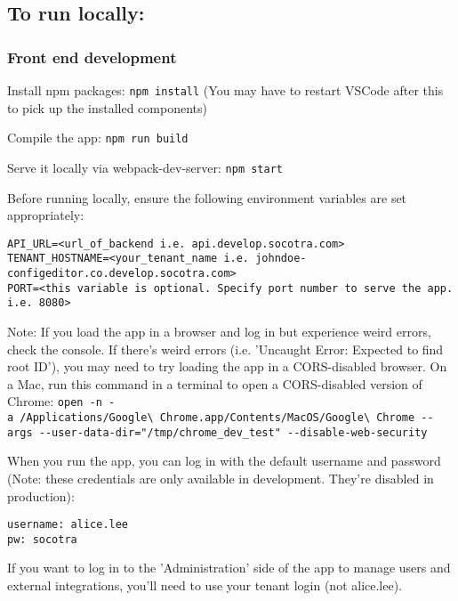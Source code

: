 \hypertarget{to-run-locally}{%
\subsection{To run locally:}\label{to-run-locally}}

\hypertarget{front-end-development}{%
\subsubsection{Front end development}\label{front-end-development}}

Install npm packages: \texttt{npm\ install} (You may have to restart
VSCode after this to pick up the installed components)

Compile the app: \texttt{npm\ run\ build}

Serve it locally via webpack-dev-server: \texttt{npm\ start}

Before running locally, ensure the following environment variables are
set appropriately:

\begin{verbatim}
API_URL=<url_of_backend i.e. api.develop.socotra.com>
TENANT_HOSTNAME=<your_tenant_name i.e. johndoe-configeditor.co.develop.socotra.com>
PORT=<this variable is optional. Specify port number to serve the app. i.e. 8080>
\end{verbatim}

Note: If you load the app in a browser and log in but experience weird
errors, check the console. If there's weird errors (i.e. 'Uncaught
Error: Expected to find root ID'), you may need to try loading the app
in a CORS-disabled browser. On a Mac, run this command in a terminal to
open a CORS-disabled version of Chrome:
\texttt{open\ -n\ -a\ /Applications/Google\textbackslash{}\ Chrome.app/Contents/MacOS/Google\textbackslash{}\ Chrome\ -\/-args\ -\/-user-data-dir="/tmp/chrome\_dev\_test"\ -\/-disable-web-security}

When you run the app, you can log in with the default username and
password (Note: these credentials are only available in development.
They're disabled in production):

\begin{verbatim}
username: alice.lee
pw: socotra
\end{verbatim}

If you want to log in to the 'Administration' side of the app to manage
users and external integrations, you'll need to use your tenant login
(not alice.lee).

